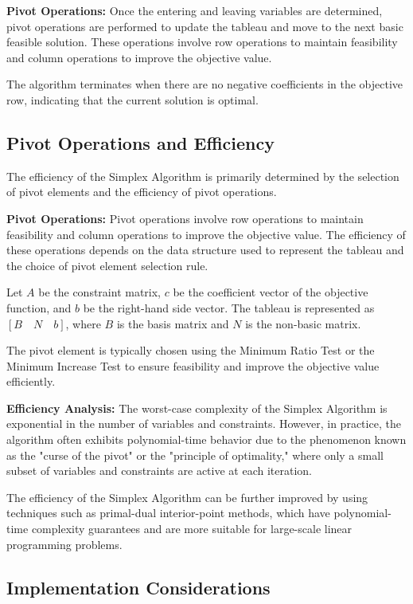 \documentclass[12pt]{book} %
\begin{document}
\textbf{Pivot Operations:} Once the entering and leaving variables are determined, pivot operations are performed to update the tableau and move to the next basic feasible solution. These operations involve row operations to maintain feasibility and column operations to improve the objective value.

The algorithm terminates when there are no negative coefficients in the objective row, indicating that the current solution is optimal.

\subsection{Pivot Operations and Efficiency}

The efficiency of the Simplex Algorithm is primarily determined by the selection of pivot elements and the efficiency of pivot operations.

\textbf{Pivot Operations:} Pivot operations involve row operations to maintain feasibility and column operations to improve the objective value. The efficiency of these operations depends on the data structure used to represent the tableau and the choice of pivot element selection rule.

Let \(A\) be the constraint matrix, \(c\) be the coefficient vector of the objective function, and \(b\) be the right-hand side vector. The tableau is represented as \([B \quad N \quad b]\), where \(B\) is the basis matrix and \(N\) is the non-basic matrix.

The pivot element is typically chosen using the Minimum Ratio Test or the Minimum Increase Test to ensure feasibility and improve the objective value efficiently.

\textbf{Efficiency Analysis:} The worst-case complexity of the Simplex Algorithm is exponential in the number of variables and constraints. However, in practice, the algorithm often exhibits polynomial-time behavior due to the phenomenon known as the "curse of the pivot" or the "principle of optimality," where only a small subset of variables and constraints are active at each iteration.

The efficiency of the Simplex Algorithm can be further improved by using techniques such as primal-dual interior-point methods, which have polynomial-time complexity guarantees and are more suitable for large-scale linear programming problems.

\subsection{Implementation Considerations}
\end{document}
